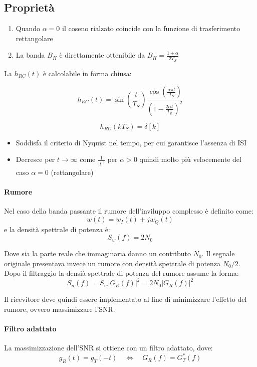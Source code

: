 \subsection*{Propriet\`a}
\begin{enumerate}
    \item Quando \( \alpha = 0 \) il coseno rialzato coincide con la funzione di trasferimento rettangolare
    \item La banda \( B_H \) \`e direttamente ottenibile da \( B_H = \frac{1+\alpha}{2T_S} \)
\end{enumerate}

La \( h_{RC}(t) \) \`e calcolabile in forma chiusa:

\[ h_{RC}(t) = \sin\left(\frac{t}{T_S}\right) \frac{\cos\left(\frac{\alpha \pi t}{T_S}\right)}{\left(1- \frac{2\alpha t}{T_S}\right)^2}  \]

\[ h_{RC}(kT_S) = \delta[k] \]

\begin{itemize}
    \item Soddisfa il criterio di Nyquist nel tempo, per cui garantisce l'assenza di ISI
    \item Decresce per \( t \rightarrow \infty \) come \( \frac{1}{|t|^3} \) per \( \alpha > 0 \) quindi molto pi\`u velocemente del caso \( \alpha = 0 \) (rettangolare)
\end{itemize}


\paragraph*{Rumore}
Nel caso della banda passante il rumore dell'inviluppo complesso è definito come:
\[
    w(t) = w_I(t) + jw_Q(t) 
\]
e la densità spettrale di potenza è:
\[
    S_w(f) = 2N_0
\]


Dove sia la parte reale che immaginaria danno un contributo $N_0$. Il segnale originale presentava invece un rumore con densità spettrale di potenza $N_0/2$.
Dopo il filtraggio la densià spettrale di potenza del rumore assume la forma:
\[
    S_n(f) = S_w |G_R(f)|^2 = 2N_0 |G_R(f)|^2
\]

Il ricevitore deve quindi essere implementato al fine di minimizzare l'effetto del rumore, ovvero massimizzare l'SNR.

\paragraph*{Filtro adattato}
La massimizzazione dell'SNR si ottiene con un filtro adattato, dove:
\[
    g_R(t) = g_T(-t) \quad \Longleftrightarrow \quad G_R(f) = G_T^*(f)
\]

